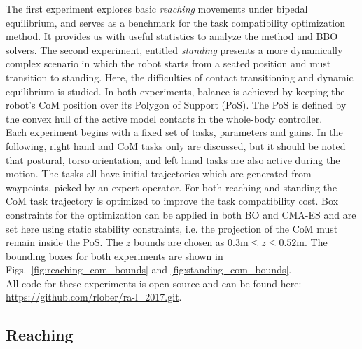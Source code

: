 \documentclass[12pt,a4paper,twoside]{article}
\begin{document}
The first experiment explores basic \textit{reaching} movements under bipedal equilibrium, and serves as a benchmark for the task compatibility optimization method. It provides us with useful statistics to analyze the method and BBO solvers. The second experiment, entitled \textit{standing} presents a more dynamically complex scenario in which the robot starts from a seated position and must transition to standing. Here, the difficulties of contact transitioning and dynamic equilibrium is studied. In both experiments, balance is achieved by keeping the robot's CoM position over its Polygon of Support (PoS). The PoS is defined by the convex hull of the active model contacts in the whole-body controller.\\

Each experiment begins with a fixed set of tasks, parameters and gains. In the following, right hand and CoM tasks only are discussed, but it should be noted that postural, torso orientation, and left hand tasks are also active during the motion. The tasks all have initial trajectories which are generated from waypoints, picked by an expert operator. For both reaching and standing the CoM task trajectory is optimized to improve the task compatibility cost. Box constraints for the optimization can be applied in both BO and CMA-ES and are set here using static stability constraints, i.e. the projection of the CoM must remain inside the PoS. The $z$ bounds are chosen as $0.3\text{m} \leq z \leq 0.52\text{m}$. The bounding boxes for both experiments are shown in Figs.~\ref{fig:reaching_com_bounds} and \ref{fig:standing_com_bounds}.\\

All code for these experiments is open-source and can be found here: {\small \url{https://github.com/rlober/ra-l_2017.git}}.




\subsection{Reaching}
\label{sec:experiments_reaching}
\end{document}
